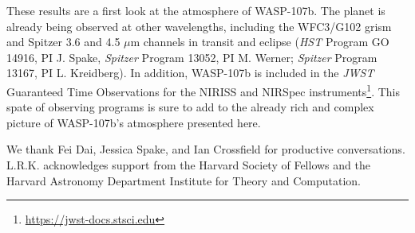 \documentclass[twocolumn]{aastex61}
\begin{document}
These results are a first look at the atmosphere of WASP-107b. The planet is already being observed at other wavelengths, including the WFC3/G102 grism and Spitzer 3.6 and 4.5 $\mu$m channels in transit and eclipse (\emph{HST} Program GO 14916, PI J. Spake, \emph{Spitzer} Program 13052, PI M. Werner; \emph{Spitzer} Program 13167, PI L. Kreidberg).  In addition, WASP-107b is included in the \emph{JWST} Guaranteed Time Observations for the NIRISS and NIRSpec instruments\footnote{\url{https://jwst-docs.stsci.edu}}.  This spate of observing programs is sure to add to the already rich and complex picture of WASP-107b's atmosphere presented here. 


\acknowledgments
We thank Fei Dai, Jessica Spake, and Ian Crossfield for productive conversations. L.R.K. acknowledges support from the Harvard Society of Fellows and the Harvard Astronomy Department Institute for Theory and Computation.



\end{document}
